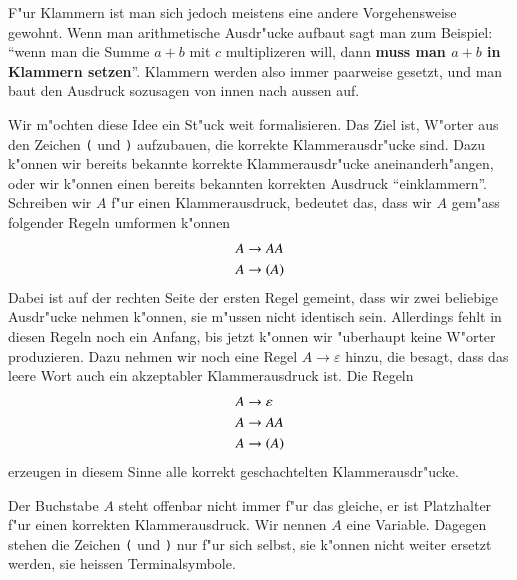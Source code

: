 F"ur Klammern ist man sich jedoch meistens eine andere Vorgehensweise
gewohnt. Wenn man arithmetische Ausdr"ucke aufbaut sagt man zum
Beispiel: ``wenn man die Summe $a+b$ mit $c$ multiplizeren will,
dann {\bf muss man $a+b$ in Klammern setzen}''.
Klammern werden also immer paarweise gesetzt, und man baut den
Ausdruck sozusagen von innen nach aussen auf.

Wir m"ochten diese Idee ein St"uck weit formalisieren. Das Ziel ist,
W"orter aus den Zeichen {\tt (} und {\tt )} aufzubauen, die korrekte
Klammerausdr"ucke sind. Dazu k"onnen wir bereits bekannte korrekte
Klammerausdr"ucke aneinanderh"angen, oder wir k"onnen einen bereits
bekannten korrekten Ausdruck ``einklammern''. Schreiben wir $A$
f"ur einen Klammerausdruck, bedeutet das, dass wir $A$ gem"ass
folgender Regeln umformen k"onnen
\begin{align*}
A&\to AA\\
A&\to {\tt (}A{\tt )}
\end{align*}
Dabei ist auf der rechten Seite der ersten Regel gemeint, dass wir zwei beliebige
Ausdr"ucke nehmen k"onnen, sie m"ussen nicht identisch sein. Allerdings
fehlt in diesen Regeln noch ein Anfang, bis jetzt k"onnen wir "uberhaupt
keine W"orter produzieren. Dazu nehmen wir noch eine Regel $A\to\varepsilon$
hinzu, die besagt, dass das leere Wort auch ein akzeptabler
Klammerausdruck ist. Die Regeln
\begin{equation}
\begin{aligned}
A&\to\varepsilon\\
A&\to AA\\
A&\to {\tt (}A{\tt )}
\end{aligned}
\label{regeln-beispiel}
\end{equation}
erzeugen in diesem Sinne alle korrekt geschachtelten Klammerausdr"ucke.

Der Buchstabe $A$ steht offenbar nicht immer f"ur das gleiche, 
er ist Platzhalter f"ur einen korrekten Klammerausdruck. Wir nennen
$A$ eine Variable.
Dagegen stehen die Zeichen {\tt (} und {\tt )} nur f"ur sich selbst, sie
k"onnen nicht weiter ersetzt werden, sie heissen Terminalsymbole.

